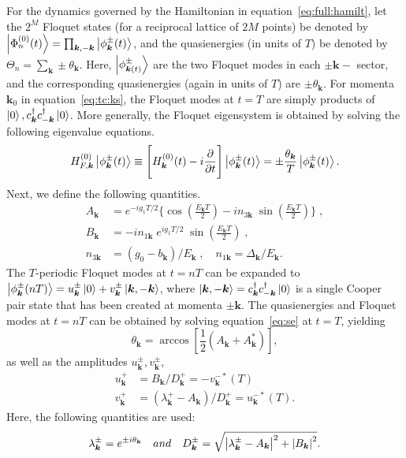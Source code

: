 \documentclass[preprint,5p,times,twocolumn]{elsarticle}
\newcommand{\bmk}{\bm{k}}
\begin{document}
For the dynamics governed by the Hamiltonian in equation~\ref{eq:full:hamilt}, let the $2^M$ Floquet states (for a reciprocal lattice of $2M$ points) be denoted by $\ket{\Phi^{(0)}_n(t)}=\prod_{\bmk, -\bmk}\ket{\phi^\pm_{\bmk}(t)}$, and the quasienergies (in units of $T$) be denoted by $\Theta_n = \sum_{\bmk} \pm\theta_{\bmk}$. Here, $\ket{\phi^\pm_{\bmk(t)}}$ are the two Floquet modes in each $\pm\bmk-$ sector, and the corresponding quasienergies (again in units of $T$) are $\pm\theta_{\bmk}$. For momenta ${\bmk_0}$ in equation~\ref{eq:tc:ks}, the Floquet modes at $t=T$ are simply products of
$\ket{0},c^\dagger_{\bmk} c^\dagger_{-\bmk}\ket{0}$. More generally, the Floquet eigensystem is obtained by solving the following eigenvalue equations.
\begin{equation}
    H^{(0)}_{F,\bmk}\ket{\phi^\pm_{\bmk}(t)} \equiv \Bigg[H^{(0)}_{\bmk}(t) - i \pdv{}{t}\Bigg]\ket{\phi^\pm_{\bmk}(t)} =\pm \frac{\theta_{\bmk}}{T} \ket{\phi^\pm_{\bmk}(t)}.
\label{eq:se}    
\end{equation}
Next, we define the following quantities.
\begin{align}
    A_{\bmk} &= e^{-i g_{1} T / 2}\Bigg\{\cos(\frac{E_{\bmk} T}{ 2})-i n_{3 {\bmk}}\; \sin(\frac{E_{\bmk} T}{ 2})\Bigg\} \;,  \nonumber \\ 
    B_{\bmk} &= -i n^{\;}_{1{\bmk}}\;e^{i g_{1} T / 2}\; \sin(\frac{E_{\bmk} T}{ 2})\;,\nonumber \\
    n^{\;}_{3 {\bmk}} &= \left(g_{0}-b_{\bmk}\right) / E_{\bmk} \;,\quad n^{\;}_{1 {\bmk}} = \Delta_{\bmk} / E_{\bmk} .
\end{align}
The $T$-periodic Floquet modes at $t=nT$ can be expanded to $\ket{\phi^\pm_{\bmk}(nT)} = u_{\bmk}^{\pm}\ket{0} + v_{\bmk}^{\pm}\ket{\bmk, -\bmk}$, where $\ket{\bmk, -\bmk} = c^\dagger_{\bmk}c^\dagger_{-\bmk}\ket{0}$ is a single Cooper pair state that has been created at momenta $\pm \bmk$. The quasienergies and Floquet modes at $t=nT$ can be obtained by solving equation~\ref{eq:se} at $t=T$, yielding
\begin{equation}
    \theta_{\bmk}=\arccos \left[\frac12 \left(A_{\bmk}+A_{\bmk}^{*}\right)\right],
    \label{eq:thetak}
\end{equation}
as well as the amplitudes $u^{\pm}_{\bmk}, v^{\pm}_{\bmk}$,
\begin{align}
        u_{\bmk}^{+}&=B_{\bmk} / D_{\bmk}^{+}=-v_{\bmk}^{-*}(T)  \nonumber \\
        v_{\bmk}^{+}&=\left(\lambda_{\bmk}^{+}-A_{\bmk}\right) / D_{\bmk}^{+}=u_{\bmk}^{-*}(T).
\end{align}
Here, the following quantities are used:
\begin{equation}
\lambda_{\bmk}^{\pm} =e^{\pm i \theta_{\bmk}}\quad and \quad
D_{\bmk}^{\pm} =\sqrt{\abs{\lambda_{\bmk}^{\pm}-A_{\bmk}}^{2}+\abs{B_{\bmk}}^{2}}.
\end{equation}
\end{document}
